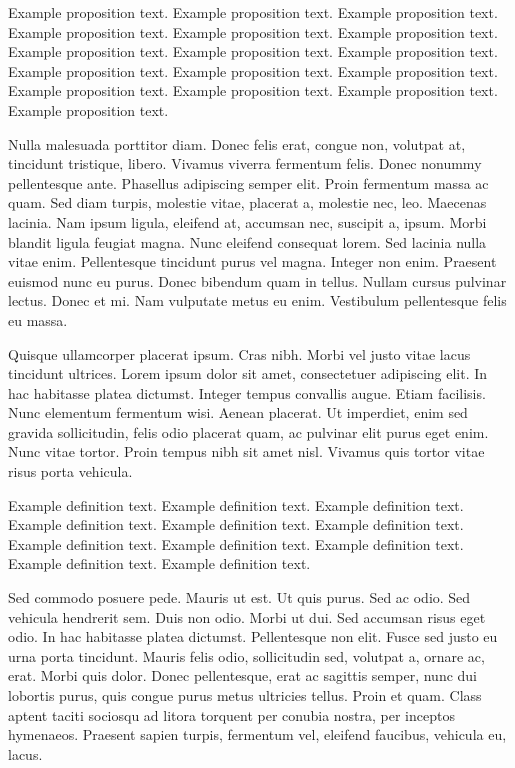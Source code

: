 \documentclass[AMS,STIX2COL]{WileyNJD-v2}
\begin{document}
    \begin{proposition}
        Example proposition text. Example proposition text. Example proposition text. Example proposition text. Example proposition text. Example proposition text. Example proposition text. Example proposition text. Example proposition text. Example proposition text. Example proposition text. Example proposition text. Example proposition text. Example proposition text. Example proposition text. Example proposition text.
    \end{proposition}

    Nulla malesuada porttitor diam. Donec felis erat, congue non, volutpat at, tincidunt tristique, libero. Vivamus
    viverra fermentum felis. Donec nonummy pellentesque ante. Phasellus adipiscing semper elit. Proin fermentum massa
    ac quam. Sed diam turpis, molestie vitae, placerat a, molestie nec, leo. Maecenas lacinia. Nam ipsum ligula, eleifend
    at, accumsan nec, suscipit a, ipsum. Morbi blandit ligula feugiat magna. Nunc eleifend consequat lorem. Sed lacinia
    nulla vitae enim. Pellentesque tincidunt purus vel magna. Integer non enim. Praesent euismod nunc eu purus. Donec
    bibendum quam in tellus. Nullam cursus pulvinar lectus. Donec et mi. Nam vulputate metus eu enim. Vestibulum
    pellentesque felis eu massa.

    Quisque ullamcorper placerat ipsum. Cras nibh. Morbi vel justo vitae lacus tincidunt ultrices. Lorem ipsum dolor sit
    amet, consectetuer adipiscing elit. In hac habitasse platea dictumst. Integer tempus convallis augue. Etiam facilisis.
    Nunc elementum fermentum wisi. Aenean placerat. Ut imperdiet, enim sed gravida sollicitudin, felis odio placerat
    quam, ac pulvinar elit purus eget enim. Nunc vitae tortor. Proin tempus nibh sit amet nisl. Vivamus quis tortor
    vitae risus porta vehicula.

    \begin{definition}
        Example definition text. Example definition text. Example definition text. Example definition text. Example definition text. Example definition text. Example definition text. Example definition text. Example definition text. Example definition text. Example definition text.
    \end{definition}

    Sed commodo posuere pede. Mauris ut est. Ut quis purus. Sed ac odio. Sed vehicula hendrerit sem. Duis non
    odio. Morbi ut dui. Sed accumsan risus eget odio. In hac habitasse platea dictumst. Pellentesque non elit. Fusce
    sed justo eu urna porta tincidunt. Mauris felis odio, sollicitudin sed, volutpat a, ornare ac, erat. Morbi quis dolor.
    Donec pellentesque, erat ac sagittis semper, nunc dui lobortis purus, quis congue purus metus ultricies tellus. Proin
    et quam. Class aptent taciti sociosqu ad litora torquent per conubia nostra, per inceptos hymenaeos. Praesent sapien
    turpis, fermentum vel, eleifend faucibus, vehicula eu, lacus.
\end{document}

